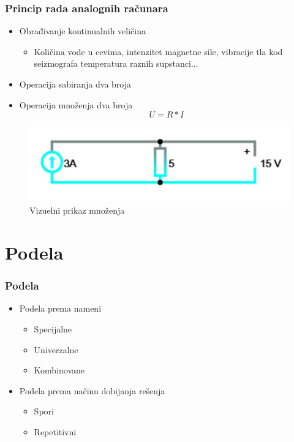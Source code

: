 \documentclass[14pt]{beamer}
\begin{document}
\begin{frame}[fragile]\frametitle{Princip rada analognih računara}
	\begin{itemize}	
		\item Obrađivanje kontinualnih veličina
		  \begin{itemize}
                \item Količina vode u cevima, intenzitet magnetne sile, vibracije tla kod seizmografa temperatura raznih supstanci...
            \end{itemize}          
	

\item Operacija sabiranja dva broja

\item Operacija množenja dva broja \\ $$ U = R*I $$
\end{itemize}
\begin{figure}[h!]
\begin{center}
\includegraphics[scale=0.6]{Struja.jpg}
\end{center}
\caption{Vizuelni prikaz množenja}
\label{fig:h1}
\end{figure}
\end{frame}

\section{Podela}
\begin{frame}[fragile]\frametitle{Podela}
	\begin{itemize}
		\item Podela prema nameni
		\begin{itemize}
			\item Specijalne
            \item Univerzalne
            \item Kombinovane
		\end{itemize}
	\end{itemize}
\begin{itemize}
	\item Podela prema načinu dobijanja rešenja
	\begin{itemize}
		\item Spori
        \item Repetitivni
	\end{itemize}
\end{itemize}
\end{frame}
\end{document}
